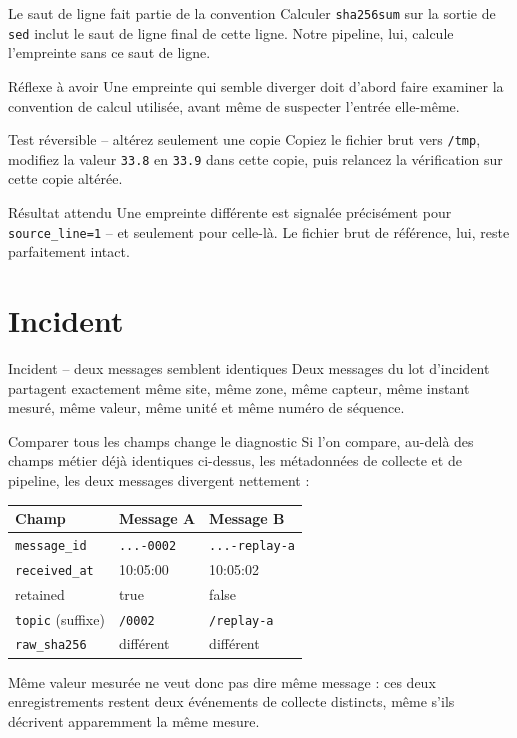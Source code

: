 \documentclass[aspectratio=169]{beamer}
\begin{document}
\begin{frame}{Le saut de ligne fait partie de la convention}
Calculer \texttt{sha256sum} sur la sortie de \texttt{sed} inclut le saut de ligne final de cette ligne. Notre pipeline, lui, calcule l'empreinte sans ce saut de ligne.
\begin{block}{Réflexe à avoir}
Une empreinte qui semble diverger doit d'abord faire examiner la convention de calcul utilisée, avant même de suspecter l'entrée elle-même.
\end{block}
\end{frame}

\begin{frame}{Test réversible -- altérez seulement une copie}
Copiez le fichier brut vers \texttt{/tmp}, modifiez la valeur \texttt{33.8} en \texttt{33.9} dans cette copie, puis relancez la vérification sur cette copie altérée.
\begin{alertblock}{Résultat attendu}
Une empreinte différente est signalée précisément pour \texttt{source\_line=1} -- et seulement pour celle-là. Le fichier brut de référence, lui, reste parfaitement intact.
\end{alertblock}
\end{frame}

\section{Incident}
\begin{frame}{Incident -- deux messages semblent identiques}
Deux messages du lot d'incident partagent exactement même site, même zone, même capteur, même instant mesuré, même valeur, même unité et même numéro de séquence.
\end{frame}

\begin{frame}{Comparer tous les champs change le diagnostic}
Si l'on compare, au-delà des champs métier déjà identiques ci-dessus, les métadonnées de collecte et de pipeline, les deux messages divergent nettement :
\begin{tabular}{@{}p{}p{}p{}@{}}
\toprule
Champ & Message A & Message B \\
\midrule
\texttt{message\_id} & \texttt{...-0002} & \texttt{...-replay-a} \\
\texttt{received\_at} & 10:05:00 & 10:05:02 \\
retained & true & false \\
\texttt{topic} (suffixe) & \texttt{/0002} & \texttt{/replay-a} \\
\texttt{raw\_sha256} & différent & différent \\
\bottomrule
\end{tabular}
\vfill
\normalsize Même valeur mesurée ne veut donc pas dire même message : ces deux enregistrements restent deux événements de collecte distincts, même s'ils décrivent apparemment la même mesure.
\end{frame}
\end{document}
